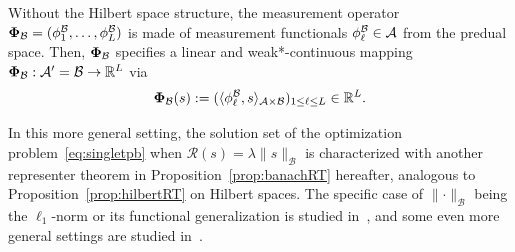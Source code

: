 \documentclass[12pt]{article}
\begin{document}
    Without the Hilbert space structure, the measurement operator ${\bm{\Phi}_\mathcal{B}}= (\phi^\mathcal{B}_1, \ldots, \phi^\mathcal{B}_L)$ is made of measurement functionals $\phi_\ell^{\mathcal{B}} \in \mathcal{A}$ from the predual space. Then, ${\bm{\Phi}_\mathcal{B}}$ specifies a linear and weak*-continuous mapping ${\bm{\Phi}_\mathcal{B}}: \mathcal{A}' =\mathcal{B} \rightarrow \mathbb{R}^L$ via 
    \begin{equation}
        \label{eq:phi-banach}
        {\bm{\Phi}_\mathcal{B}} (s) := (\langle \phi_\ell^{\mathcal{B}}, s \rangle_{\mathcal{A}\times\mathcal{B}})_{1\leq \ell \leq L} \in \mathbb{R}^L.
    \end{equation}

    In this more general setting, the solution set of the optimization problem~\eqref{eq:singletpb} when $\mathcal{R}(s) = \lambda \| s \|_{\mathcal{B}}$ is characterized with another representer theorem in Proposition~\ref{prop:banachRT} hereafter, analogous to Proposition~\ref{prop:hilbertRT} on Hilbert spaces.
    The specific case of $\lVert \cdot \rVert_\mathcal{B}$ being the $\ell_1$-norm or its functional generalization is studied in~\cite{Fisher1975,Unser2016representer,unser2017splines,bredies2020sparsity}, and some even more general settings are studied in~\cite{boyer2019representer,unser2019native}.


    
\end{document}
